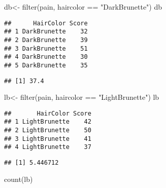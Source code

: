 \documentclass[
]{article}
\newenvironment{Shaded}{\begin{snugshade}}{\end{snugshade}}
\newcommand{\FunctionTok}[1]{\textcolor[rgb]{0.00,0.00,0.00}{#1}}
\newcommand{\NormalTok}[1]{#1}
\newcommand{\OtherTok}[1]{\textcolor[rgb]{0.56,0.35,0.01}{#1}}
\newcommand{\SpecialCharTok}[1]{\textcolor[rgb]{0.00,0.00,0.00}{#1}}
\newcommand{\StringTok}[1]{\textcolor[rgb]{0.31,0.60,0.02}{#1}}
\begin{document}
\begin{Shaded}
\begin{Highlighting}[]
\NormalTok{db}\OtherTok{\textless{}{-}} \FunctionTok{filter}\NormalTok{(pain, haircolor }\SpecialCharTok{==} \StringTok{"DarkBrunette"}\NormalTok{) }
\NormalTok{db}
\end{Highlighting}
\end{Shaded}

\begin{verbatim}
##      HairColor Score
## 1 DarkBrunette    32
## 2 DarkBrunette    39
## 3 DarkBrunette    51
## 4 DarkBrunette    30
## 5 DarkBrunette    35
\end{verbatim}

\begin{Shaded}
\end{Shaded}

\begin{verbatim}
## [1] 37.4
\end{verbatim}

\begin{Shaded}
\begin{Highlighting}[]
\NormalTok{lb}\OtherTok{\textless{}{-}} \FunctionTok{filter}\NormalTok{(pain, haircolor }\SpecialCharTok{==} \StringTok{"LightBrunette"}\NormalTok{)}
\NormalTok{lb}
\end{Highlighting}
\end{Shaded}

\begin{verbatim}
##       HairColor Score
## 1 LightBrunette    42
## 2 LightBrunette    50
## 3 LightBrunette    41
## 4 LightBrunette    37
\end{verbatim}

\begin{Shaded}
\end{Shaded}

\begin{verbatim}
## [1] 5.446712
\end{verbatim}

\begin{Shaded}
\begin{Highlighting}[]
\FunctionTok{count}\NormalTok{(lb)}
\end{Highlighting}
\end{Shaded}
\end{document}
